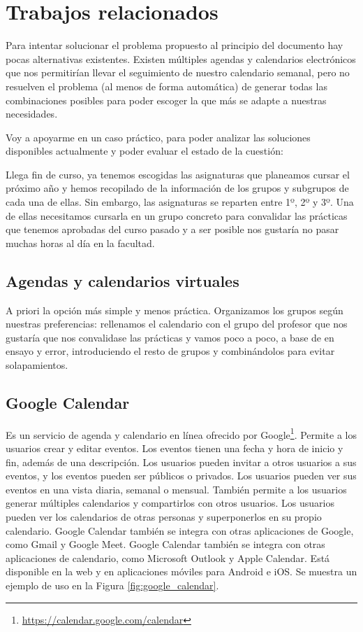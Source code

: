 \section{Trabajos relacionados}

Para intentar solucionar el problema propuesto al principio del documento hay pocas alternativas existentes. Existen múltiples agendas y calendarios electrónicos que nos permitirían llevar el seguimiento de nuestro calendario semanal, pero no resuelven el problema (al menos de forma automática) de generar todas las combinaciones posibles para poder escoger la que más se adapte a nuestras necesidades.\newline

Voy a apoyarme en un caso práctico, para poder analizar las soluciones disponibles actualmente y poder evaluar el estado de la cuestión:\newline

Llega fin de curso, ya tenemos escogidas las asignaturas que planeamos cursar el próximo año y hemos recopilado de la información de los grupos y subgrupos de cada una de ellas. Sin embargo, las asignaturas se reparten entre 1º, 2º y 3º. Una de ellas necesitamos cursarla en un grupo concreto para convalidar las prácticas que tenemos aprobadas del curso pasado y a ser posible nos gustaría no pasar muchas horas al día en la facultad.

\subsection{Agendas y calendarios virtuales}
A priori la opción más simple y menos práctica. Organizamos los grupos según nuestras preferencias: rellenamos el calendario con el grupo del profesor que nos gustaría que nos convalidase las prácticas y vamos poco a poco, a base de en ensayo y error, introduciendo el resto de grupos y combinándolos para evitar solapamientos.

\subsection{Google Calendar}
Es un servicio de agenda y calendario en línea ofrecido por Google\footnote{\url{https://calendar.google.com/calendar}}.  Permite a los usuarios crear y editar eventos. Los eventos tienen una fecha y hora de inicio y fin, además de una descripción. Los usuarios pueden invitar a otros usuarios a sus eventos, y los eventos pueden ser públicos o privados. Los usuarios pueden ver sus eventos en una vista diaria, semanal o mensual. También permite a los usuarios generar múltiples calendarios y compartirlos con otros usuarios. Los usuarios pueden ver los calendarios de otras personas y superponerlos en su propio calendario. Google Calendar también se integra con otras aplicaciones de Google, como Gmail y Google Meet. Google Calendar también se integra con otras aplicaciones de calendario, como Microsoft Outlook y Apple Calendar. Está disponible en la web y en aplicaciones móviles para Android e iOS. Se muestra un ejemplo de uso en la Figura \ref{fig:google_calendar}.


